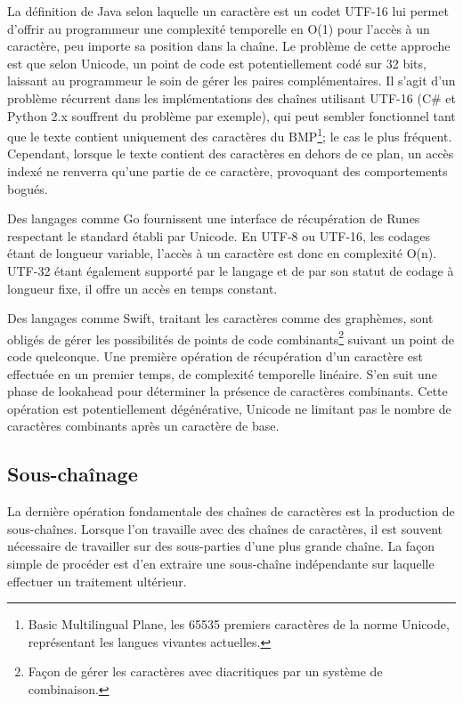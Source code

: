 La définition de Java selon laquelle un caractère est un codet UTF-16 lui permet d'offrir
au programmeur une complexité temporelle en O(1) pour l'accès à un caractère, peu importe
sa position dans la chaîne.
Le problème de cette approche est que selon Unicode, un point de code est potentiellement
codé sur 32 bits, laissant au programmeur le soin de gérer les paires complémentaires.
Il s'agit d'un problème récurrent dans les implémentations des chaînes utilisant UTF-16
(C\# et Python 2.x souffrent du problème par exemple),
qui peut sembler fonctionnel tant que le texte contient uniquement des caractères du 
BMP\footnote{Basic Multilingual Plane, les 65535 premiers caractères de la norme Unicode,
représentant les langues vivantes actuelles.}; le cas le plus fréquent.
Cependant, lorsque le texte contient des caractères en dehors de ce plan, un accès indexé
ne renverra qu'une partie de ce caractère, provoquant des comportements bogués.

Des langages comme Go fournissent une interface de récupération de Runes respectant
le standard établi par Unicode.
En UTF-8 ou UTF-16, les codages étant de longueur variable, l'accès à un caractère
est donc en complexité O(n).
UTF-32 étant également supporté par le langage et de par son statut de codage à
longueur fixe, il offre un accès en temps constant.

Des langages comme Swift, traitant les caractères comme des graphèmes, sont
obligés de gérer les possibilités de points de code combinants\footnote{Façon de gérer les caractères avec diacritiques par un système de combinaison.}
suivant un point de code quelconque.
Une première opération de récupération d'un caractère est effectuée en un premier temps, de complexité
temporelle linéaire.
S'en suit une phase de lookahead pour déterminer la présence de caractères combinants.
Cette opération est potentiellement dégénérative, Unicode ne limitant pas le nombre de
caractères combinants après un caractère de base.

\subsection{Sous-chaînage}

La dernière opération fondamentale des chaînes de caractères est la production de
sous-chaînes.
Lorsque l'on travaille avec des chaînes de caractères, il est souvent nécessaire
de travailler sur des sous-parties d'une plus grande chaîne.
La façon simple de procéder est d'en extraire une sous-chaîne indépendante sur
laquelle effectuer un traitement ultérieur.

